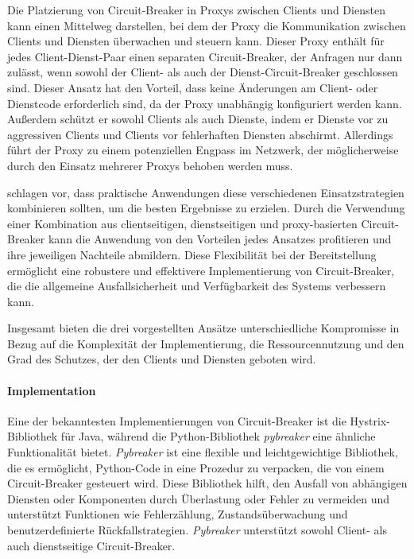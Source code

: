Die Platzierung von Circuit-Breaker in Proxys zwischen Clients und Diensten
kann einen Mittelweg darstellen,
bei dem der Proxy die Kommunikation zwischen Clients und Diensten überwachen und steuern kann.
Dieser Proxy enthält für jedes Client-Dienst-Paar einen separaten Circuit-Breaker, der Anfragen nur dann zulässt,
wenn sowohl der Client- als auch der Dienst-Circuit-Breaker geschlossen sind.
Dieser Ansatz hat den Vorteil, dass keine Änderungen am Client- oder Dienstcode erforderlich sind,
da der Proxy unabhängig konfiguriert werden kann.
Außerdem schützt er sowohl Clients als auch Dienste, indem er Dienste vor zu aggressiven Clients und Clients
vor fehlerhaften Diensten abschirmt.
Allerdings führt der Proxy zu einem potenziellen Engpass im Netzwerk,
der möglicherweise durch den Einsatz mehrerer Proxys behoben werden muss.

\citet{Montesi.19.09.2016} schlagen vor, dass praktische Anwendungen diese verschiedenen Einsatzstrategien
kombinieren sollten, um die besten Ergebnisse zu erzielen.
Durch die Verwendung einer Kombination aus clientseitigen, dienstseitigen und proxy-basierten Circuit-Breaker
kann die Anwendung von den Vorteilen jedes Ansatzes profitieren und ihre jeweiligen Nachteile abmildern.
Diese Flexibilität bei der Bereitstellung ermöglicht eine robustere und effektivere Implementierung von Circuit-Breaker,
die die allgemeine Ausfallsicherheit und Verfügbarkeit des Systems verbessern kann.

Insgesamt bieten die drei vorgestellten Ansätze unterschiedliche Kompromisse in Bezug auf die Komplexität der Implementierung,
die Ressourcennutzung und den Grad des Schutzes, der den Clients und Diensten geboten wird.

\paragraph{Implementation}


Eine der bekanntesten Implementierungen von Circuit-Breaker ist die Hystrix-Bibliothek für Java,
während die Python-Bibliothek \textit{pybreaker} eine ähnliche Funktionalität bietet.
\textit{Pybreaker} ist eine flexible und leichtgewichtige Bibliothek, die es ermöglicht,
Python-Code in eine Prozedur zu verpacken, die von einem Circuit-Breaker gesteuert wird.
Diese Bibliothek hilft, den Ausfall von abhängigen Diensten oder Komponenten durch Überlastung
oder Fehler zu vermeiden und unterstützt Funktionen wie Fehlerzählung,
Zustandsüberwachung und benutzerdefinierte Rückfallstrategien. %
\textit{Pybreaker} unterstützt sowohl Client- als auch dienstseitige Circuit-Breaker.

